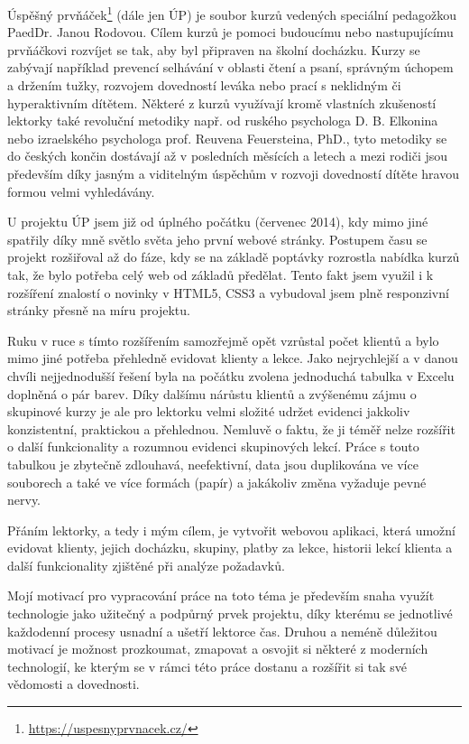 Úspěšný prvňáček\footnote{\url{https://uspesnyprvnacek.cz/}} (dále jen ÚP) je soubor kurzů vedených speciální pedagožkou PaedDr. Janou Rodovou. Cílem kurzů je pomoci budoucímu nebo nastupujícímu prvňáčkovi rozvíjet se tak, aby byl připraven na školní docházku. Kurzy se zabývají například prevencí selhávání v oblasti čtení a psaní, správným úchopem a držením tužky, rozvojem dovedností leváka nebo prací s neklidným či hyperaktivním dítětem. Některé z kurzů využívají kromě vlastních zkušeností lektorky také revoluční metodiky např. od ruského psychologa D. B. Elkonina nebo izraelského psychologa prof. Reuvena Feuersteina, PhD., tyto metodiky se do českých končin dostávají až v posledních měsících a letech a mezi rodiči jsou především díky jasným a viditelným úspěchům v rozvoji dovedností dítěte hravou formou velmi vyhledávány.

U projektu ÚP jsem již od úplného počátku (červenec 2014), kdy mimo jiné spatřily díky mně světlo světa jeho první webové stránky. Postupem času se projekt rozšiřoval až do fáze, kdy se na základě poptávky rozrostla nabídka kurzů tak, že bylo potřeba celý web od základů předělat. Tento fakt jsem využil i k rozšíření znalostí o novinky v HTML5, CSS3 a vybudoval jsem plně responzivní stránky přesně na míru projektu.

Ruku v ruce s tímto rozšířením samozřejmě opět vzrůstal počet klientů a bylo mimo jiné potřeba přehledně evidovat klienty a lekce. Jako nejrychlejší a v danou chvíli nejjednodušší řešení byla na počátku zvolena jednoduchá tabulka v Excelu doplněná o pár barev. Díky dalšímu nárůstu klientů a zvýšenému zájmu o skupinové kurzy je ale pro lektorku velmi složité udržet evidenci jakkoliv konzistentní, praktickou a přehlednou. Nemluvě o faktu, že ji téměř nelze rozšířit o další funkcionality a rozumnou evidenci skupinových lekcí. Práce s touto tabulkou je zbytečně zdlouhavá, neefektivní, data jsou duplikována ve více souborech a také ve více formách (papír) a jakákoliv změna vyžaduje pevné nervy.

Přáním lektorky, a tedy i mým cílem, je vytvořit webovou aplikaci, která umožní evidovat klienty, jejich docházku, skupiny, platby za lekce, historii lekcí klienta a další funkcionality zjištěné při analýze požadavků.

Mojí motivací pro vypracování práce na toto téma je především snaha využít technologie jako užitečný a podpůrný prvek projektu, díky kterému se jednotlivé každodenní procesy usnadní a ušetří lektorce čas. Druhou a neméně důležitou motivací je možnost prozkoumat, zmapovat a osvojit si některé z moderních technologií, ke kterým se v rámci této práce dostanu a rozšířit si tak své vědomosti a dovednosti.

